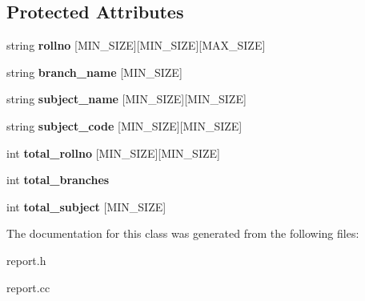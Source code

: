 \subsection*{Protected Attributes}
\begin{DoxyCompactItemize}
\item 
\hypertarget{classReport_ad70c33afec0f55b741b02a61fe31f1b2}{string {\bfseries rollno} \mbox{[}M\-I\-N\-\_\-\-S\-I\-Z\-E\mbox{]}\mbox{[}M\-I\-N\-\_\-\-S\-I\-Z\-E\mbox{]}\mbox{[}M\-A\-X\-\_\-\-S\-I\-Z\-E\mbox{]}}\label{classReport_ad70c33afec0f55b741b02a61fe31f1b2}

\item 
\hypertarget{classReport_a43f2ffe183cf3b85dcb0554fbb04591c}{string {\bfseries branch\-\_\-name} \mbox{[}M\-I\-N\-\_\-\-S\-I\-Z\-E\mbox{]}}\label{classReport_a43f2ffe183cf3b85dcb0554fbb04591c}

\item 
\hypertarget{classReport_ac44f34e0a5294d2298ae851b1054202e}{string {\bfseries subject\-\_\-name} \mbox{[}M\-I\-N\-\_\-\-S\-I\-Z\-E\mbox{]}\mbox{[}M\-I\-N\-\_\-\-S\-I\-Z\-E\mbox{]}}\label{classReport_ac44f34e0a5294d2298ae851b1054202e}

\item 
\hypertarget{classReport_a790d6e3c8f84fcc98b721ab1c2721812}{string {\bfseries subject\-\_\-code} \mbox{[}M\-I\-N\-\_\-\-S\-I\-Z\-E\mbox{]}\mbox{[}M\-I\-N\-\_\-\-S\-I\-Z\-E\mbox{]}}\label{classReport_a790d6e3c8f84fcc98b721ab1c2721812}

\item 
\hypertarget{classReport_a081487d00afb339102182a782c83bb5f}{int {\bfseries total\-\_\-rollno} \mbox{[}M\-I\-N\-\_\-\-S\-I\-Z\-E\mbox{]}\mbox{[}M\-I\-N\-\_\-\-S\-I\-Z\-E\mbox{]}}\label{classReport_a081487d00afb339102182a782c83bb5f}

\item 
\hypertarget{classReport_a7832c744bc5e0394b421fe026df35157}{int {\bfseries total\-\_\-branches}}\label{classReport_a7832c744bc5e0394b421fe026df35157}

\item 
\hypertarget{classReport_ad292c3ed92feb665b04f1db33cfb09aa}{int {\bfseries total\-\_\-subject} \mbox{[}M\-I\-N\-\_\-\-S\-I\-Z\-E\mbox{]}}\label{classReport_ad292c3ed92feb665b04f1db33cfb09aa}

\end{DoxyCompactItemize}


The documentation for this class was generated from the following files\-:\begin{DoxyCompactItemize}
\item 
report.\-h\item 
report.\-cc\end{DoxyCompactItemize}
